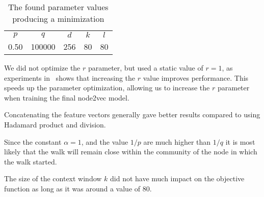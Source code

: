 \begin{table}%
\centering
\begin{tabular}{ccccc}
\toprule
$p$  & $q$     & $d$ & $k$ & $l$ \\
\num{0.50} & \num{100000} & 256 & 80  & 80 \\
\bottomrule
\end{tabular}
\caption[The found parameter values producing a minimization]{The found parameter values producing a minimization}%
\label{tab:paramopt_goodvalues}%
\end{table}

We did not optimize the $r$ parameter, but used a static value of $r=1$, as experiments in~\cite{node2vec} shows that increasing the $r$ value improves performance. This speeds up the parameter optimization, allowing us to increase the $r$ parameter when training the final node2vec model.

Concatenating the feature vectors generally gave better results compared to using Hadamard product and division.

Since the constant $\alpha = 1$, and the value $1/p$ are much higher than $1/q$ it is most likely that the walk will remain close within the community of the node in which the walk started.

The size of the context window $k$ did not have much impact on the objective function as long as it was around a value of $80$.

